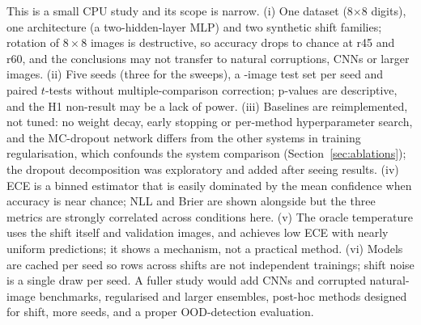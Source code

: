 This is a small CPU study and its scope is narrow. (i) One dataset (8$\times$8 digits), one architecture (a two-hidden-layer MLP) and two synthetic shift families; rotation of $8{\times}8$ images is destructive, so accuracy drops to chance at r45 and r60, and the conclusions may not transfer to natural corruptions, CNNs or larger images. (ii) Five seeds (three for the sweeps), a -image test set per seed and paired $t$-tests without multiple-comparison correction; p-values are descriptive, and the H1 non-result may be a lack of power. (iii) Baselines are reimplemented, not tuned: no weight decay, early stopping or per-method hyperparameter search, and the MC-dropout network differs from the other systems in training regularisation, which confounds the system comparison (Section~\ref{sec:ablations}); the dropout decomposition was exploratory and added after seeing results. (iv) ECE is a binned estimator that is easily dominated by the mean confidence when accuracy is near chance; NLL and Brier are shown alongside but the three metrics are strongly correlated across conditions here. (v) The oracle temperature uses the shift itself and  validation images, and achieves low ECE with nearly uniform predictions; it shows a mechanism, not a practical method. (vi) Models are cached per seed so rows across shifts are not independent trainings; shift noise is a single draw per seed. A fuller study would add CNNs and corrupted natural-image benchmarks, regularised and larger ensembles, post-hoc methods designed for shift, more seeds, and a proper OOD-detection evaluation.
